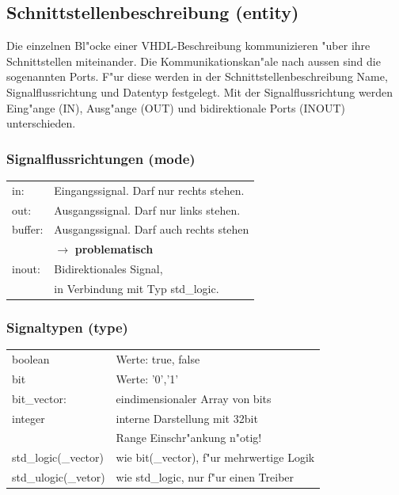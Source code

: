 	\subsection{Schnittstellenbeschreibung (entity)}
		Die einzelnen Bl"ocke einer VHDL-Beschreibung kommunizieren "uber ihre 
		Schnittstellen miteinander. Die Kommunikationskan"ale nach aussen sind die 
		sogenannten Ports. F"ur diese werden in der Schnittstellenbeschreibung Name, 		
		Signalflussrichtung und Datentyp festgelegt. Mit der Signalflussrichtung werden 
		Eing"ange (IN), Ausg"ange (OUT) und bidirektionale Ports (INOUT) unterschieden.
		\begin{multicols}{2}
			
			
		\end{multicols}
	\begin{multicols}{2}
	\subsubsection{Signalflussrichtungen (mode)}
		\begin{tabular}{ll}
			in: & Eingangssignal. Darf nur rechts stehen.\\
			out: & Ausgangssignal. Darf nur links stehen.\\
			buffer: & Ausgangssignal. Darf auch rechts stehen\\
			&  $\rightarrow$ \textbf{problematisch}\\
			inout: & Bidirektionales Signal, \\
			& in Verbindung mit Typ std\_logic.\\
		\end{tabular}
	\subsubsection{Signaltypen (type)}
		\begin{tabular}{ll}
			boolean & Werte: true, false\\
			bit & Werte: '0','1'\\
			bit\_vector: & eindimensionaler Array von bits\\
			integer & interne Darstellung mit 32bit\\
			& Range Einschr"ankung n"otig!\\
			std\_logic(\_vector) & wie bit(\_vector), f"ur mehrwertige Logik\\
			std\_ulogic(\_vetor) & wie std\_logic, nur f"ur einen Treiber\\
		\end{tabular}
	\end{multicols}
	

